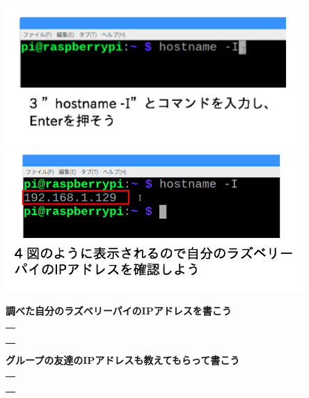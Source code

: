 \documentclass[a4paper,12pt,dvipdfmx]{jarticle}
\begin{document}
\clearpage

\centering

\includegraphics[width=0.85\textwidth]{ome7-img010.png}
\centering
\includegraphics[width=0.85\textwidth]{ome7-img009.png}
\flushleft


\bigskip


\bigskip


\bigskip


\bigskip

{\bfseries
	調べた自分のラズベリーパイのIPアドレスを書こう}

\bigskip


\centering
\begin{tabular}{|p{}|} \hline
	\\
	\\
	\\
	\\ \hline
\end{tabular}


\bigskip


\bigskip

\flushleft

{\bfseries
	グループの友達のIPアドレスも教えてもらって書こう}

\bigskip


\centering
\begin{tabular}{|p{}|} \hline
	\\
	\\
	\\
	\\ \hline
\end{tabular}
\end{document}
